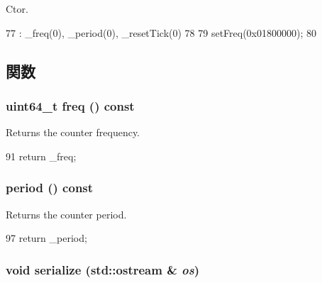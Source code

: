Ctor. 


\begin{DoxyCode}
77             : _freq(0), _period(0), _resetTick(0)
78         {
79             setFreq(0x01800000);
80         }
\end{DoxyCode}


\subsection{関数}
\hypertarget{classGenericTimer_1_1SystemCounter_a00e7a4566af18a56108947d8c929c0e3}{
\subsubsection[{freq}]{\setlength{\rightskip}{0pt plus 5cm}uint64\_\-t freq () const}}
\label{classGenericTimer_1_1SystemCounter_a00e7a4566af18a56108947d8c929c0e3}


Returns the counter frequency. 


\begin{DoxyCode}
91 { return _freq; }
\end{DoxyCode}
\hypertarget{classGenericTimer_1_1SystemCounter_a03f23d1f4180d4c5fe907543679ca146}{
\subsubsection[{period}]{ period () const}}
\label{classGenericTimer_1_1SystemCounter_a03f23d1f4180d4c5fe907543679ca146}


Returns the counter period. 


\begin{DoxyCode}
97 { return _period; }
\end{DoxyCode}
\hypertarget{classGenericTimer_1_1SystemCounter_a53e036786d17361be4c7320d39c99b84}{
\subsubsection[{serialize}]{\setlength{\rightskip}{0pt plus 5cm}void serialize (std::ostream \& {\em os})}}
\label{classGenericTimer_1_1SystemCounter_a53e036786d17361be4c7320d39c99b84}



